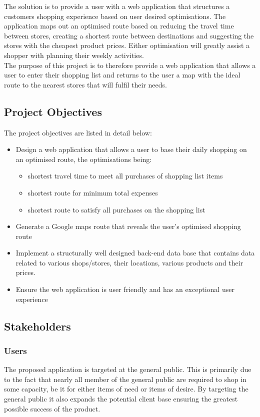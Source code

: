 \documentclass[10pt,twocolumn]{witseiepaper}
\begin{document}
		The solution is to provide a user with a web application that structures a customers shopping experience based on user desired optimisations. The application maps out an optimised route based on reducing the travel time between stores, creating a shortest route between destinations and suggesting the stores with the cheapest product prices. Either optimisation will greatly assist a shopper with planning their weekly activities. \\
		
		The purpose of this project is to therefore provide a web application that allows a user to enter their shopping list and returns to the user a map with the ideal route to the nearest stores that will fulfil their needs. 

	\subsection{Project Objectives}

		The project objectives are listed in detail below:

		\begin{itemize}
			\item Design a web application that allows a user to base their daily shopping on an optimised route, the optimisations being:
			\begin{itemize}
				\item shortest travel time to meet all purchases of shopping list items 
				\item shortest route for minimum total expenses
				\item shortest route to satisfy all purchases on the shopping list 
			\end{itemize}
			\item Generate a Google maps route that reveals the user's optimised shopping route~\cite{maps}
			\item Implement a structurally well designed back-end data base that contains data related to various shops/stores, their locations, various products and their prices.
			\item Ensure the web application is user friendly and has an exceptional user experience
		\end{itemize}

	\subsection{Stakeholders}
		
		\subsubsection{Users} The proposed application is targeted at the general public. This is primarily due to the fact that nearly all member of the general public are required to shop in some capacity, be it for either items of need or items of desire. By targeting the general public it also expands the potential client base ensuring the greatest possible success of the product.\\
		
\end{document}

